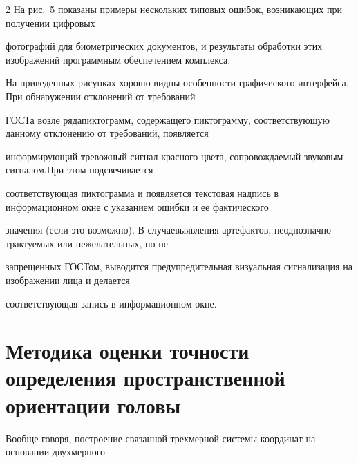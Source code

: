 \begin{multicols}{2}
На рис.~5 показаны примеры нескольких типовых ошибок, возникающих при получении циф\-ро\-вых 


фотографий для биометрических документов, и результаты обработки этих изображений про\-грам\-мным обеспечением комплекса.








На приведенных рисунках хорошо видны особенности графического интерфейса. При обнаружении отклонений от требований 


ГОСТа возле ряда\linebreak пиктограмм, содержащего пиктограмму, соответствующую данному отклонению от требований, появляется 


информирующий тревожный сигнал красного цвета, сопровождаемый звуковым сигналом.\linebreak При этом подсвечивается 


соответствующая пиктограмма и появляется текстовая надпись в информационном окне с указанием ошибки и ее фактического 


значения (если это возможно). В случае\linebreak выявления артефактов, неоднозначно трактуемых или нежелательных, но не 


запрещенных ГОСТом, выводится предупредительная визуальная сигнализация на изображении лица и делается 


соответствующая запись в информационном окне.





\section{Методика оценки точности определения пространственной ориентации головы}





Вообще говоря, построение связанной трехмерной системы координат на основании двухмерного\linebreak\vspace*{-12pt}


\pagebreak





\begin{center} %


\vspace*{2pt}



\end{center}
\end{multicols}
